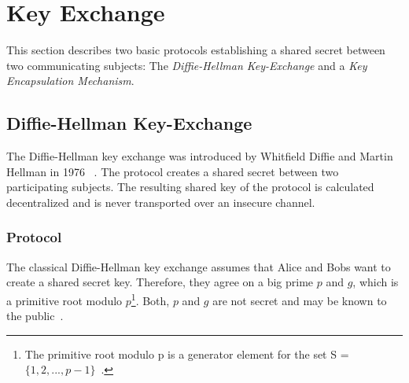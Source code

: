 \section{Key Exchange}
This section describes two basic protocols establishing a shared secret between two communicating subjects: The \textit{Diffie-Hellman Key-Exchange} and a \textit{Key Encapsulation Mechanism}.

\subsection{Diffie-Hellman Key-Exchange}

The Diffie-Hellman key exchange was introduced by Whitfield Diffie and Martin Hellman in 1976 ~\parencite{diffie1976new}. The protocol creates a shared secret between two participating subjects. The resulting shared key of the protocol is calculated decentralized and is never transported over an insecure channel.

\subsubsection{Protocol}
The classical Diffie-Hellman key exchange assumes that Alice and Bobs want to create a shared secret key. Therefore, they agree on a big prime $p$ and $g$, which is a primitive root modulo $p$\footnote{The primitive root modulo p is a generator element for the set S = $\{1, 2, ... , p-1\}$~\parencite{ITSicherheit}.}. Both, $p$ and $g$ are not secret and may be known to the public~\parencite{watjen2018kryptographie}.

